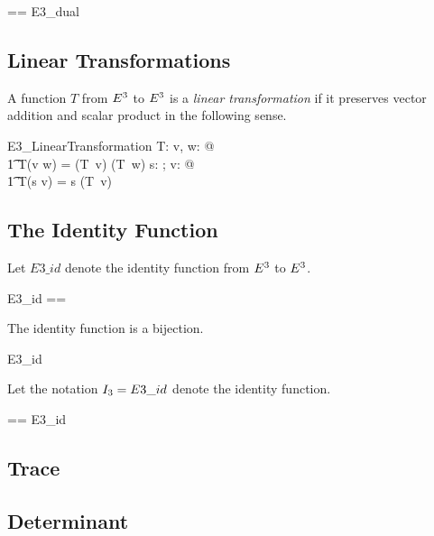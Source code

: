 \documentclass{amsart}
\begin{document}
\begin{zed}
	\dualEthree == E3\_dual
\end{zed}

\subsection{Linear Transformations}

A function $T$ from $E^3$ to $E^3$ is a \textit{linear transformation} if it preserves vector addition and scalar product
in the following sense.

\begin{schema}{E3\_LinearTransformation}
	T: \Ethree \fun \Ethree
\where
	\forall v, w: \Ethree @ \\
	\t1	T(v \addEthree w) = (T~v) \addEthree (T~w)
\also
	\forall s: \R; v: \Ethree @ \\
	\t1	T(s \mulEthree v) = s \mulEthree (T~v)
\end{schema}

\subsection{The Identity Function}

Let $E3\_id$ denote the identity function from $E^3$ to $E^3$.

\begin{zed}
	E3\_id == \id \Ethree
\end{zed}

\begin{remark}
The identity function is a bijection.
\begin{zed}
	E3\_id \in \Ethree \bij \Ethree
\end{zed}
\end{remark}

Let the notation $I_3 = E3\_id$ denote the identity function.

\begin{zed}
	\idEthree == E3\_id
\end{zed}

\subsection{Trace}

\subsection{Determinant}
\end{document}
